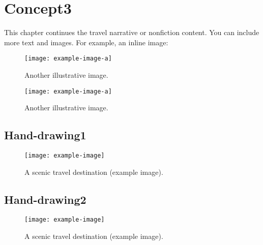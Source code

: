 \newpage
\section{Concept3}
This chapter continues the travel narrative or nonfiction content. You can include more text and images. For example, an inline image:
\begin{figure}[htbp]
  \centering
  \texttt{[image: example-image-a]} 
  \caption{Another illustrative image.}
\end{figure}
\lipsum[1]  %
\begin{figure}[htbp]
  \centering
  \texttt{[image: example-image-a]} 
  \caption{Another illustrative image.}
\end{figure}
\lipsum[2]  %


\newpage
\subsection{Hand-drawing1}
\lipsum[1]  %
\begin{figure}[htbp]
  \centering
  \texttt{[image: example-image]} %
  \caption{A scenic travel destination (example image).}
\end{figure}


\newpage
\subsection{Hand-drawing2}
\lipsum[1]  %
\begin{figure}[htbp]
  \centering
  \texttt{[image: example-image]} %
  \caption{A scenic travel destination (example image).}
\end{figure}

